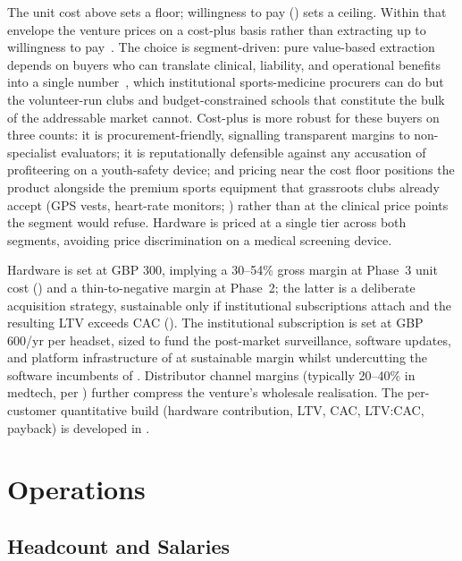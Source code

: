 The unit cost above sets a floor; willingness to pay () sets a ceiling. Within that envelope the venture prices on a cost-plus basis rather than extracting up to willingness to pay~\citep{nagle2017pricing}. The choice is segment-driven: pure value-based extraction depends on buyers who can translate clinical, liability, and operational benefits into a single number~\citep{hinterhuber2008value}, which institutional sports-medicine procurers can do but the volunteer-run clubs and budget-constrained schools that constitute the bulk of the addressable market cannot. Cost-plus is more robust for these buyers on three counts: it is procurement-friendly, signalling transparent margins to non-specialist evaluators; it is reputationally defensible against any accusation of profiteering on a youth-safety device; and pricing near the cost floor positions the product alongside the premium sports equipment that grassroots clubs already accept (GPS vests, heart-rate monitors; ) rather than at the clinical price points the segment would refuse. Hardware is priced at a single tier across both segments, avoiding price discrimination on a medical screening device.

Hardware is set at GBP 300, implying a 30--54\% gross margin at Phase~3 unit cost () and a thin-to-negative margin at Phase~2; the latter is a deliberate acquisition strategy, sustainable only if institutional subscriptions attach and the resulting LTV exceeds CAC (). The institutional subscription is set at GBP 600/yr per headset, sized to fund the post-market surveillance, software updates, and platform infrastructure of  at sustainable margin whilst undercutting the software incumbents of . Distributor channel margins (typically 20--40\% in medtech, per ) further compress the venture's wholesale realisation. The per-customer quantitative build (hardware contribution, LTV, CAC, LTV:CAC, payback) is developed in .


\section{Operations}
\label{sec:ent-operations}

\subsection{Headcount and Salaries}
\label{sec:ent-ops-headcount}
\label{sec:ent-ops-org}
\label{sec:ent-ops-salaries}

